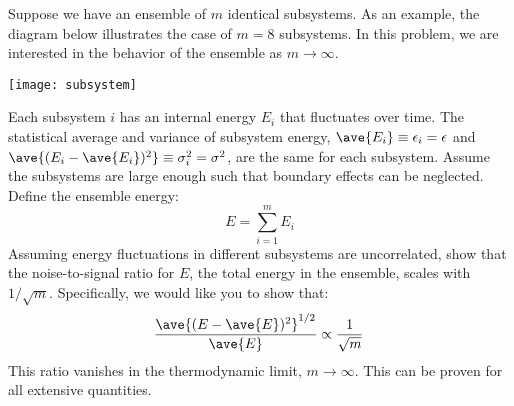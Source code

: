 
\bigskip
{}
Suppose we have an ensemble of $m$ identical subsystems.
As an example, the diagram below illustrates the case of $m=8$ subsystems. 
In this problem, we are interested in the behavior of the ensemble
as $m \rightarrow \infty$. \\ \par
\centerline{\texttt{[image: subsystem]}}\smallskip
\noindent Each subsystem $i$ has an internal energy $E_i$ that fluctuates over time.
The statistical average and variance of subsystem energy, 
$\ave{E_i} \equiv \epsilon_i = \epsilon$ and
$\ave{(E_i - \ave{E_i})^2} \equiv \sigma^2_i = \sigma^2 $,
are the same for each subsystem.
Assume the subsystems are large enough such that boundary effects can be neglected.
Define the ensemble energy:
\[ E = \sum_{i=1}^m E_i \] 
Assuming energy fluctuations in different subsystems are uncorrelated,
show that the noise-to-signal ratio for $E$,
the total energy in the ensemble, scales with $1/\sqrt{m}$.
Specifically, we would like you to show that:
\[ \frac{\ave{(E - \ave{E})^2}^{1/2}}{\ave{E}} \propto \frac{1}{\sqrt{m}}\, \]
This ratio vanishes in the thermodynamic limit, $m\to\infty$.
This can be proven for all extensive quantities. 

